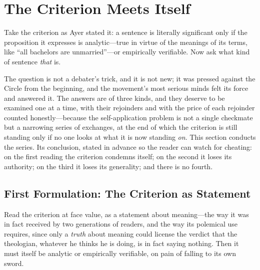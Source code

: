 \section{The Criterion Meets Itself}

Take the criterion as Ayer stated it: a sentence is literally significant only if the proposition it expresses is analytic---true in virtue of the meanings of its terms, like ``all bachelors are unmarried''---or empirically verifiable. Now ask what kind of sentence \emph{that} is.

The question is not a debater's trick, and it is not new; it was pressed against the Circle from the beginning, and the movement's most serious minds felt its force and answered it. The answers are of three kinds, and they deserve to be examined one at a time, with their rejoinders and with the price of each rejoinder counted honestly---because the self-application problem is not a single checkmate but a narrowing series of exchanges, at the end of which the criterion is still standing only if no one looks at what it is now standing \emph{on}. This section conducts the series. Its conclusion, stated in advance so the reader can watch for cheating: on the first reading the criterion condemns itself; on the second it loses its authority; on the third it loses its generality; and there is no fourth.

\subsection{First Formulation: The Criterion as Statement}

Read the criterion at face value, as a statement about meaning---the way it was in fact received by two generations of readers, and the way its polemical use requires, since only a \emph{truth} about meaning could license the verdict that the theologian, whatever he thinks he is doing, is in fact saying nothing. Then it must itself be analytic or empirically verifiable, on pain of falling to its own sword.

